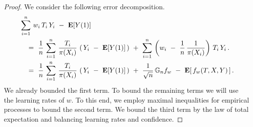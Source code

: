 \begin{proof}
  We consider the following error decomposition.
\begin{align}
  \begin{split}
  &\sum_{i=1}^{n}
  \,
  w_i\,T_i\,Y_i
  \ 
  -
  \ 
  \E[Y(1)]
  \\
  &\quad=
    \ 
    \frac{1}{n}
    \,
  \sum_{i=1}^{n}
  \,
    \frac{T_i}{\pi(X_i)}
    \,
  \left(
    \,
    Y_i
    \ 
    -
    \ 
  \E[Y(1)]
  \,
  \right)
  \ +
  \ 
  \sum_{i=1}^{n}
  \,
  \left( 
    w_i
    \ 
    -
    \ 
    \frac{1}{n}\,
    \frac{1}{\pi(X_i)}
  \right)
  \,
  T_i
  \,
  Y_i
  \,.
  \\
  & 
  \quad
  =
  \ 
   \frac{1}{n}
    \,
  \sum_{i=1}^{n}
  \,
    \frac{T_i}{\pi(X_i)}
    \,
  \left(
    \,
    Y_i
    \ 
    -
    \ 
  \E[Y(1)]
  \,
  \right)
  \ 
  +
  \ 
  \frac{1}{\sqrt{n}}
  \,
  \G_n f_w
  \ 
  -
  \ 
  \E[
  \,
  f_w(T,X,Y)
  \,
  ]
  \,.
  \end{split}
\end{align}
We already bounded the first term. 
To bound the remaining terms we will use the learning rates of $w$.
To this end, we employ maximal inequalities for empirical processes to bound the second term.
We bound the third term by the law of total expectation and balancing learning rates and confidence.

\end{proof}

